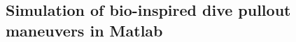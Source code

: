 \documentclass[onecolumn,10pt]{IEEEtran}
\newcommand{\MATLAB}{Matlab}
\newcommand{\Matlab}{Matlab}
\begin{document}
\subsection{Simulation of bio-inspired dive pullout maneuvers in \Matlab}
\end{document}

